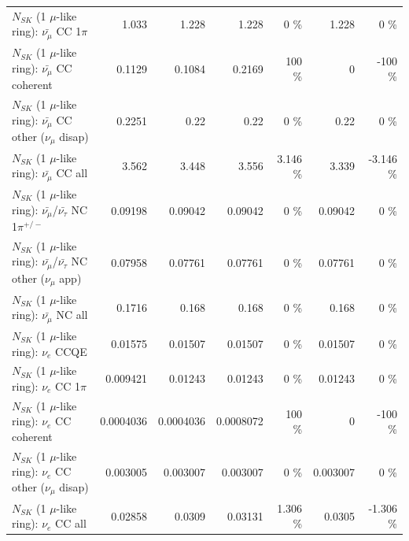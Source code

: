 \begin{table}
\begin{tabular}{| l | r | r | r  r | r  r |}
                         $N_{SK}$ (1 $\mu$-like ring): $\bar{\nu_\mu}$ CC 1$\pi$ &           1.033 &           1.228 &           1.228 &        0 \%  &           1.228 &        0 \%  \\ 
                       $N_{SK}$ (1 $\mu$-like ring): $\bar{\nu_\mu}$ CC coherent &          0.1129 &          0.1084 &          0.2169 &      100 \%  &               0 &     -100 \%  \\ 
        $N_{SK}$ (1 $\mu$-like ring): $\bar{\nu_\mu}$ CC other ($\nu_\mu$ disap) &          0.2251 &            0.22 &            0.22 &        0 \%  &            0.22 &        0 \%  \\ 
                          $N_{SK}$ (1 $\mu$-like ring): $\bar{\nu_{\mu}}$ CC all &           3.562 &           3.448 &           3.556 &    3.146 \%  &           3.339 &   -3.146 \%  \\ 
\hline
  $N_{SK}$ (1 $\mu$-like ring): $\bar{\nu_\mu}$/$\bar{\nu_\tau}$ NC 1$\pi^{+/-}$ &         0.09198 &         0.09042 &         0.09042 &        0 \%  &         0.09042 &        0 \%  \\ 
$N_{SK}$ (1 $\mu$-like ring): $\bar{\nu_\mu}$/$\bar{\nu_\tau}$ NC other ($\nu_\mu$ app) &         0.07958 &         0.07761 &         0.07761 &        0 \%  &         0.07761 &        0 \%  \\ 
                          $N_{SK}$ (1 $\mu$-like ring): $\bar{\nu_{\mu}}$ NC all &          0.1716 &           0.168 &           0.168 &        0 \%  &           0.168 &        0 \%  \\ 
\hline
\hline
\hline
                                      $N_{SK}$ (1 $\mu$-like ring): $\nu_e$ CCQE &         0.01575 &         0.01507 &         0.01507 &        0 \%  &         0.01507 &        0 \%  \\ 
                                 $N_{SK}$ (1 $\mu$-like ring): $\nu_e$ CC 1$\pi$ &        0.009421 &         0.01243 &         0.01243 &        0 \%  &         0.01243 &        0 \%  \\ 
                               $N_{SK}$ (1 $\mu$-like ring): $\nu_e$ CC coherent &       0.0004036 &       0.0004036 &       0.0008072 &      100 \%  &               0 &     -100 \%  \\ 
                $N_{SK}$ (1 $\mu$-like ring): $\nu_e$ CC other ($\nu_\mu$ disap) &        0.003005 &        0.003007 &        0.003007 &        0 \%  &        0.003007 &        0 \%  \\ 
                                  $N_{SK}$ (1 $\mu$-like ring): $\nu_{e}$ CC all &         0.02858 &          0.0309 &         0.03131 &    1.306 \%  &          0.0305 &   -1.306 \%  \\ 

\end{tabular}
\end{table}
